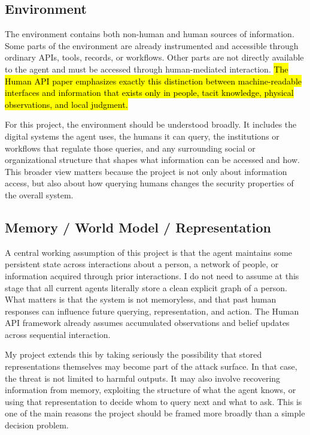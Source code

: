 \documentclass[11pt]{article}
\begin{document}
\subsection{Environment}

The environment contains both non-human and human sources of information. Some parts of the environment are already instrumented and accessible through ordinary APIs, tools, records, or workflows. Other parts are not directly available to the agent and must be accessed through human-mediated interaction. \hl{The Human API paper emphasizes exactly this distinction between machine-readable interfaces and information that exists only in people, tacit knowledge, physical observations, and local judgment.} \citep{oliver2026humanapi}

For this project, the environment should be understood broadly. It includes the digital systems the agent uses, the humans it can query, the institutions or workflows that regulate those queries, and any surrounding social or organizational structure that shapes what information can be accessed and how. This broader view matters because the project is not only about information access, but also about how querying humans changes the security properties of the overall system.

\subsection{Memory / World Model / Representation}

A central working assumption of this project is that the agent maintains some persistent state across interactions about a person, a network of people, or information acquired through prior interactions. I do not need to assume at this stage that all current agents literally store a clean explicit graph of a person. What matters is that the system is not memoryless, and that past human responses can influence future querying, representation, and action. The Human API framework already assumes accumulated observations and belief updates across sequential interaction. \citep{oliver2026humanapi}

My project extends this by taking seriously the possibility that stored representations themselves may become part of the attack surface. In that case, the threat is not limited to harmful outputs. It may also involve recovering information from memory, exploiting the structure of what the agent knows, or using that representation to decide whom to query next and what to ask. This is one of the main reasons the project should be framed more broadly than a simple decision problem.
\end{document}
